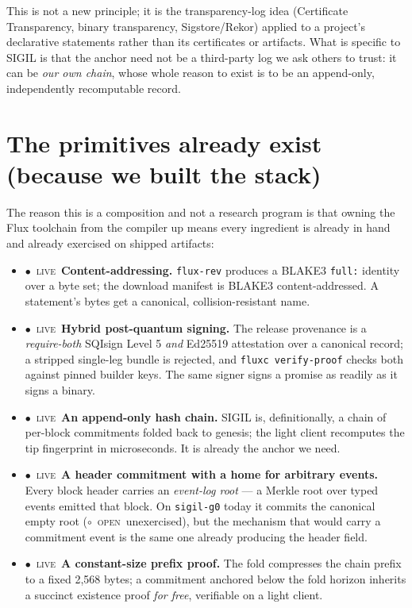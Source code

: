 \documentclass[10pt,a4paper]{article}
\newcommand{\stO}{\textcolor{sigilamber}{$\circ$}~{\scriptsize\textcolor{sigilamber}{\textsc{open}}}}
\newcommand{\stL}{\textcolor{sigilcyan}{$\bullet$}~{\scriptsize\textcolor{sigilcyan}{\textsc{live}}}}
\begin{document}
This is not a new principle; it is the transparency-log idea (Certificate
Transparency, binary transparency, Sigstore/Rekor) applied to a project's declarative
statements rather than its certificates or artifacts. What is specific to SIGIL is
that the anchor need not be a third-party log we ask others to trust: it can be
\emph{our own chain}, whose whole reason to exist is to be an append-only,
independently recomputable record.

\section{The primitives already exist (because we built the stack)}
The reason this is a composition and not a research program is that owning the Flux
toolchain from the compiler up means every ingredient is already in hand and already
exercised on shipped artifacts:

\begin{itemize}[leftmargin=1.2em,itemsep=3pt]
\item \stL~\textbf{Content-addressing.} \texttt{flux-rev} produces a BLAKE3
  \texttt{full:} identity over a byte set; the download manifest is BLAKE3
  content-addressed. A statement's bytes get a canonical, collision-resistant name.
\item \stL~\textbf{Hybrid post-quantum signing.} The release provenance is a
  \emph{require-both} SQIsign Level 5 \emph{and} Ed25519 attestation over a canonical
  record; a stripped single-leg bundle is rejected, and \texttt{fluxc verify-proof}
  checks both against pinned builder keys. The same signer signs a promise as readily
  as it signs a binary.
\item \stL~\textbf{An append-only hash chain.} SIGIL is, definitionally, a chain of
  per-block commitments folded back to genesis; the light client recomputes the tip
  fingerprint in microseconds. It is already the anchor we need.
\item \stL~\textbf{A header commitment with a home for arbitrary events.} Every block
  header carries an \emph{event-log root} --- a Merkle root over typed events emitted
  that block. On \texttt{sigil-g0} today it commits the canonical empty root
  (\stO~unexercised), but the mechanism that would carry a commitment event is the
  same one already producing the header field.
\item \stL~\textbf{A constant-size prefix proof.} The fold compresses the chain prefix
  to a fixed 2{,}568 bytes; a commitment anchored below the fold horizon inherits a
  succinct existence proof \emph{for free}, verifiable on a light client.
\end{itemize}
\end{document}
